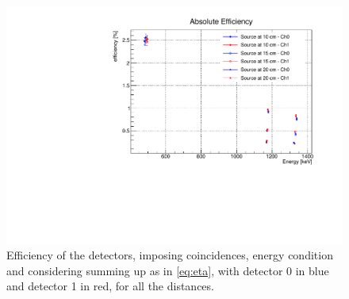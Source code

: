 \begin{figure}[H]
    \centering
    \includegraphics[scale=0.5]{Images/analysis/efficiency/Eff_all.pdf}
    \caption{Efficiency of the detectors, imposing coincidences, energy condition and considering summing up as in \ref{eq:eta}, with detector 0 in blue and detector 1 in red, for all the distances.}
    \label{fig:eff_all}
\end{figure}

